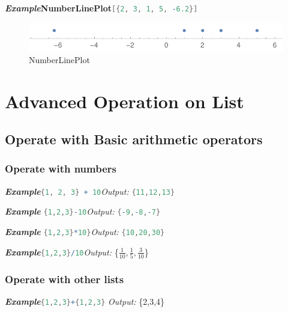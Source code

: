 \documentclass[10pt]{book}
\begin{document}
\emph{\textbf{Example}}\quad\textbf{NumberLinePlot}\lstinline[language=Mathematica]|[{2, 3, 1, 5, -6.2}]|

\begin{figure}[H]
  \centering
  \includegraphics[width=0.45\linewidth]{figures/NumberLinePlot}
  \caption{NumberLinePlot}
\end{figure}






\section{Advanced Operation on List}
\label{sec:label}

\subsection{Operate with Basic arithmetic operators}
\label{subsec:label}

\subsubsection{Operate with numbers}
\noindent\emph{\textbf{Example}}\quad\lstinline[language=Mathematica]|{1, 2, 3} + 10|\hspace{\fill}\emph{Output:} \lstinline[language=Mathematica]|{11,12,13}|

\noindent\emph{\textbf{Example}}\quad
\lstinline[language=Mathematica]|{1,2,3}-10|\hspace{\fill}\emph{Output:} \lstinline[language=Mathematica]|{-9,-8,-7}|


\noindent\emph{\textbf{Example}}\quad
\lstinline[language=Mathematica]|{1,2,3}*10}|\hspace{\fill}\emph{Output:} \lstinline[language=Mathematica]|{10,20,30}|

\noindent\emph{\textbf{Example}}\quad\lstinline[language=Mathematica]|{1,2,3}/10|\hspace{\fill}\emph{Output:} \{$\frac{1}{10},\frac{1}{5},\frac{3}{10}$\}

\subsubsection{Operate with other lists}
\noindent\emph{\textbf{Example}}\quad \lstinline[language=Mathematica]|{1,2,3}+{1,2,3}| \hspace{\fill}\emph{Output:} \{2,3,4\}
\end{document}
